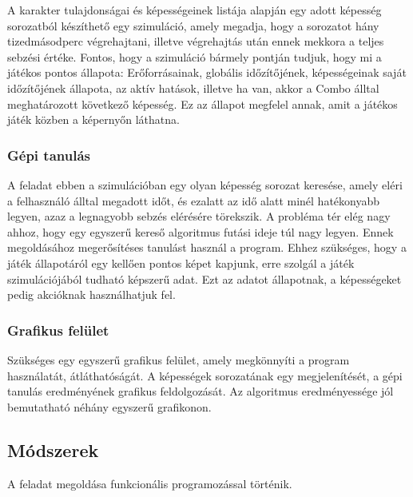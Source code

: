 \documentclass[12pt]{article}
\begin{document}
A karakter tulajdonságai és képességeinek listája alapján egy adott képesség sorozatból készíthető egy szimuláció, amely megadja, hogy a sorozatot hány tizedmásodperc végrehajtani, illetve végrehajtás után ennek mekkora a teljes sebzési értéke.
\newline
Fontos, hogy a szimuláció bármely pontján tudjuk, hogy mi a játékos pontos állapota: Erőforrásainak, globális időzítőjének, képességeinak saját időzítőjének állapota, az aktív hatások, illetve ha van, akkor a Combo álltal meghatározott következő képesség.
\newline
Ez az állapot megfelel annak, amit a játékos játék közben a képernyőn láthatna.

\subsubsection{Gépi tanulás}

A feladat ebben a szimulációban egy olyan képesség sorozat keresése, amely eléri a felhasználó álltal megadott időt, és ezalatt az idő alatt minél hatékonyabb legyen, azaz a legnagyobb sebzés elérésére törekszik.
\newline
A probléma tér elég nagy ahhoz, hogy egy egyszerű kereső algoritmus futási ideje túl nagy legyen. Ennek megoldásához megerősítéses tanulást használ a program.
\newline
Ehhez szükséges, hogy a játék állapotáról egy kellően pontos képet kapjunk, erre szolgál a játék szimulációjából tudható képszerű adat. Ezt az adatot állapotnak, a képességeket pedig akcióknak használhatjuk fel.

\subsubsection{Grafikus felület}

Szükséges egy egyszerű grafikus felület, amely megkönnyíti a program használatát, átláthatóságát. A képességek sorozatának egy megjelenítését, a gépi tanulás eredményének grafikus feldolgozását.
\newline
Az algoritmus eredményessége jól bemutatható néhány egyszerű grafikonon.

\pagebreak

\subsection{Módszerek}

A feladat megoldása funkcionális programozással történik.
\end{document}
